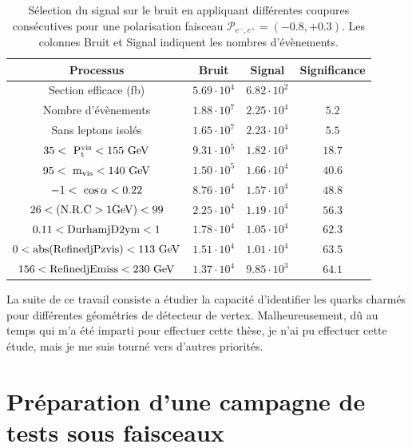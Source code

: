     \begin{table}
    \begin{tabular}{c c c c}
      \hline
      Processus                                     & Bruit        & Signal              & Significance  \tabularnewline
      \hline
      \hline
      Section efficace (fb)                          & $5.69 \cdot 10^{4}$ & $6.82 \cdot 10^{2}$ &               \tabularnewline
      Nombre d'évènements                       & $1.88 \cdot 10^{7}$ & $2.25 \cdot 10^{4}$ & $5.2$         \tabularnewline
      Sans leptons isolés                         & $1.65 \cdot 10^{7}$ & $2.23 \cdot 10^{4}$ & $5.5$         \tabularnewline
      {$35 <~\rm{{P}_{t}^{vis}} < 155~\rm{GeV} $} & $9.31 \cdot 10^{5}$ & $1.82 \cdot 10^{4}$ & $18.7$        \tabularnewline
      {$95 <~\rm{m_{vis}}< 140~\rm{GeV}$}         & $1.50 \cdot 10^{5}$ & $1.66 \cdot 10^{4}$ & $40.6$        \tabularnewline
      {$-1 <~\rm{\cos{\alpha}}< 0.22$}            & $8.76 \cdot 10^{4}$ & $1.57 \cdot 10^{4}$ & $48.8$        \tabularnewline
      $26 < (\rm{N.R.C > 1GeV}) < 99$                    & $2.25 \cdot 10^{4}$ & $1.19 \cdot 10^{4}$ & $56.3$        \tabularnewline
      $0.11 < \rm{DurhamjD2ym} < 1$               & $1.78 \cdot 10^{4}$ & $1.05 \cdot 10^{4}$ & $62.3$        \tabularnewline
      $0 < \rm{abs(RefinedjPzvis)} < 113~\rm{GeV}$& $1.51 \cdot 10^{4}$ & $1.01 \cdot 10^{4}$ & $63.5$        \tabularnewline
      $156 < \rm{RefinedjEmiss} < 230~\rm{GeV}$   & $1.37 \cdot 10^{4}$ & $9.85 \cdot 10^{3}$ & $64.1$        \tabularnewline      
    \end{tabular}
    \caption{Sélection du signal sur le bruit en appliquant différentes coupures consécutives pour une polarisation faisceau $\mathcal{P}_{e^{-},e^{+}} = (-0.8, +0.3)$. 
    Les colonnes \og{}Bruit\fg{} et \og{}Signal\fg{} indiquent les nombres d'évènements.}
    \label{tab:cutFlow_resume}
  \end{table}

  La suite de ce travail consiste a étudier la capacité d'identifier les quarks charmés pour différentes géométries de détecteur de vertex. 
  Malheureusement, dû au temps qui m'a été imparti pour effectuer cette thèse, je n'ai pu effectuer cette étude, mais je me suis tourné vers d'autres priorités.

  \section{Préparation d'une campagne de tests sous faisceaux}

